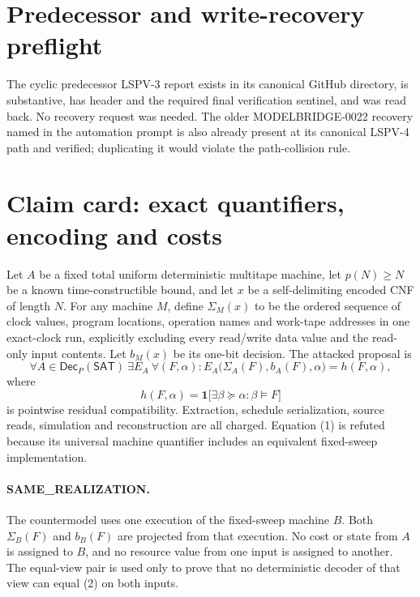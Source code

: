 \documentclass[11pt]{article}
\newcommand{\claim}[1]{\texttt{\detokenize{#1}}}
\begin{document}
\section{Predecessor and write-recovery preflight}
The cyclic predecessor LSPV-3 report
exists in its canonical GitHub directory, is substantive, has header
\claim{FIELDMASK1} and the required final verification sentinel, and was read
back.  No recovery request was needed.  The older MODELBRIDGE-0022 recovery
named in the automation prompt is also already present at its canonical
LSPV-4 path and verified; duplicating it would violate the path-collision rule.

\section{Claim card: exact quantifiers, encoding and costs}
Let $A$ be a fixed total uniform deterministic multitape machine, let
$p(N)\ge N$ be a known time-constructible bound, and let $x$ be a
self-delimiting encoded CNF of length $N$.  For any machine $M$, define
$\Sigma_M(x)$ to be the ordered sequence of clock values, program locations,
operation names and work-tape addresses in one exact-clock run, explicitly
excluding every read/write data value and the read-only input contents.  Let
$b_M(x)$ be its one-bit decision.  The attacked proposal is
\[
 \forall A\in\mathsf{Dec}_{P}(\mathsf{SAT})\ \exists E_A\ \forall(F,\alpha):
 E_A\bigl(\Sigma_A(F),b_A(F),\alpha\bigr)
 =h(F,\alpha),                                           \tag{1}
\]
where
\[
 h(F,\alpha)=\mathbf 1\bigl[\exists\beta\succeq\alpha:
                         \beta\models F\bigr]             \tag{2}
\]
is pointwise residual compatibility.  Extraction, schedule serialization,
source reads, simulation and reconstruction are all charged.  Equation (1)
is refuted because its universal machine quantifier includes an equivalent
fixed-sweep implementation.

\paragraph{SAME\_REALIZATION.}
The countermodel uses one execution of the fixed-sweep machine $B$.  Both
$\Sigma_B(F)$ and $b_B(F)$ are projected from that execution.  No cost or
state from $A$ is assigned to $B$, and no resource value from one input is
assigned to another.  The equal-view pair is used only to prove that no
deterministic decoder of that view can equal (2) on both inputs.
\end{document}
